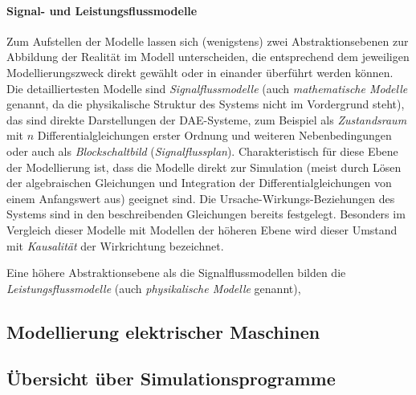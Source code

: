 \paragraph{Signal- und Leistungsflussmodelle} Zum Aufstellen der Modelle lassen sich (wenigstens) zwei Abstraktionsebenen zur Abbildung der Realität im Modell unterscheiden, die entsprechend dem jeweiligen Modellierungszweck direkt gewählt oder in einander überführt werden können. Die detailliertesten Modelle sind \emph{Signalflussmodelle} (auch \emph{mathematische Modelle} genannt, da die physikalische Struktur des Systems nicht im Vordergrund steht), das sind direkte Darstellungen der DAE-Systeme, zum Beispiel als \emph{Zustandsraum} mit $n$ Differentialgleichungen erster Ordnung und weiteren Nebenbedingungen oder auch als \emph{Blockschaltbild} (\emph{Signalflussplan}). Charakteristisch für diese Ebene der Modellierung ist, dass die Modelle direkt zur Simulation (meist durch Lösen der algebraischen Gleichungen und Integration der Differentialgleichungen von einem Anfangswert aus) geeignet sind. Die Ursache-Wirkungs-Beziehungen des Systems sind in den beschreibenden Gleichungen bereits festgelegt. Besonders im Vergleich dieser Modelle mit Modellen der höheren Ebene wird dieser Umstand mit \emph{Kausalität} der Wirkrichtung bezeichnet.

Eine höhere Abstraktionsebene als die Signalflussmodellen bilden die \emph{Leistungsflussmodelle} (auch \emph{physikalische Modelle} genannt), 


\subsection{Modellierung elektrischer Maschinen}
\label{subsec:ModellierungElektrischerMaschinen}


\subsection{Übersicht über Simulationsprogramme}
\label{subsec:Simulationsprogramme}













